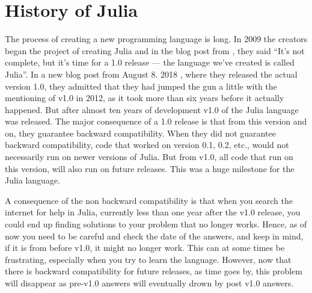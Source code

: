 \section{History of Julia}
The process of creating a new programming language is long. In 2009 the creators began the project of creating Julia and in the blog post from \citet{juliaBlogRelease2012}, they said \enquote{It's not complete, but it's time for a 1.0 release — the language we’ve created is called Julia}. In a new blog post from August 8. 2018 \emph{\citep{juliaBlogReleaseV1.0}}, where they released the actual version 1.0, they admitted that they had jumped the gun a little with the mentioning of v1.0 in 2012, as it took more than six years before it actually happened. But after almost ten years of development v1.0 of the Julia language was released. The major consequence of a 1.0 release is that from this version and on, they guarantee backward compatibility. When they did not guarantee backward compatibility, code that worked on version 0.1, 0.2, etc., would not necessarily run on newer versions of Julia. But from v1.0, all code that run on this version, will also run on future releases. This was a huge milestone for the Julia language. 

A consequence of the non backward compatibility is that when you search the internet for help in Julia, currently less than one year after the v1.0 release, you could end up finding solutions to your problem that no longer works. Hence, as of now you need to be careful and check the date of the answers, and keep in mind, if it is from before v1.0, it might no longer work. This can at some times be frustrating, especially when you try to learn the language. However, now that there is backward compatibility for future releases, as time goes by, this problem will disappear as pre-v1.0 answers will eventually drown by post v1.0 answers.

